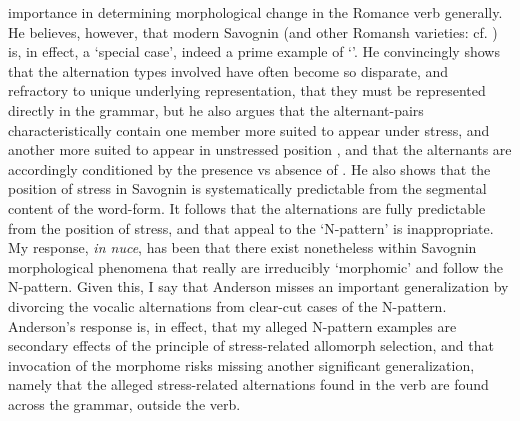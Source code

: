 \documentclass[output=paper,
modfonts
]{LSP/langsci}
\begin{document}
importance in determining morphological change in the Romance verb
generally. He believes, however, that modern Savognin (and other Romansh
varieties: cf. \citealt{anderson2013stem}) is, in effect, a `special case', indeed a
prime example of `'. He
convincingly shows that the alternation types involved have often become
so disparate, and refractory to unique underlying representation, that
they must be represented directly in the grammar, but he also argues
that the alternant-pairs characteristically contain one member more
suited to appear under stress, and another more suited to appear in
unstressed position \citep[18]{anderson2011a}, and that the alternants are
accordingly conditioned by the presence vs absence of . He also
shows that the position of stress in Savognin is systematically
predictable from the segmental content of the word-form. It follows that
the alternations are fully predictable from the position of stress, and
that appeal to the `N-pattern' is inappropriate. My response, \emph{in
nuce}, has been that there exist nonetheless within Savognin
morphological phenomena that really are irreducibly `morphomic' and
follow the N-pattern. Given this, I say that Anderson misses an
important generalization by divorcing the vocalic alternations from
clear-cut cases of the N-pattern. Anderson's response is, in effect,
that my alleged N-pattern examples are secondary effects of the
principle of stress-related allomorph selection, and that invocation of
the morphome risks missing another significant generalization, namely
that the alleged stress-related alternations found in the verb are found
across the grammar, outside the verb.
\end{document}
